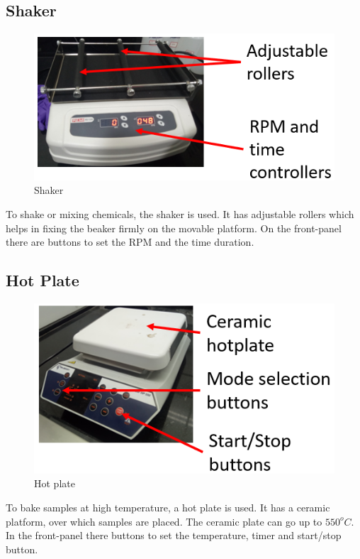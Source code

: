 \documentclass[12pt,a4paper,bold]{thesis}
\theoremstyle{thm}
\theoremstyle{definition}
\begin{document}
\subsection{Shaker}
\begin{figure}[H]
	\centering
   \includegraphics[scale=0.56]{Images/5.png} 
   \caption{Shaker}
\end{figure}
To shake or mixing chemicals, the shaker is used. It has adjustable rollers which helps in fixing the beaker firmly on the movable platform. On the front-panel there are buttons to set the RPM and the time duration.

\subsection{Hot Plate}
\begin{figure}[H]
	\centering
   \includegraphics[scale=0.56]{Images/6.png} 
   \caption{Hot plate}
\end{figure}
To bake samples at high temperature, a hot plate is used. It has a ceramic platform, over which samples are placed. The ceramic plate can go up to $550^o C$. In the front-panel there buttons to set the temperature, timer and start/stop button.
\end{document}
